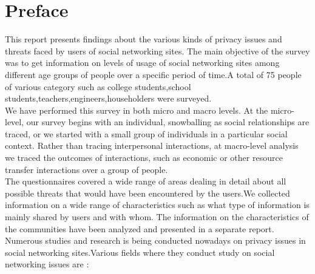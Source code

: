\documentclass[11pt]{book}
\begin{document}
\chapter*{Preface}

This  report  presents  findings about the various kinds of privacy issues and  threats faced by users of social networking sites. The main objective of the survey was to get information on levels of usage of social networking sites among different age groups of people over a specific period of time.A total of 75 people of various category such as college students,school students,teachers,engineers,householders were surveyed.
\\We have performed this survey in both micro and macro levels. At the micro-level, our survey begins with an individual, snowballing as social relationships are traced, or we started  with a small group of individuals in a particular social context. Rather than tracing interpersonal interactions, at macro-level analysis we  traced the outcomes of interactions, such as economic or other resource transfer interactions over a group of people.
\\The questionnaires covered a wide range of areas dealing in detail about all possible threats that would have been encountered by the users.We collected information on a wide range of  characteristics such as what type of information is mainly shared by users and  with whom. The information on the characteristics of the communities have been analyzed and presented in a separate report.
\\Numerous studies and research is being conducted nowadays on privacy issues in social networking sites.Various fields where they conduct study on social networking issues are :
\end{document}
